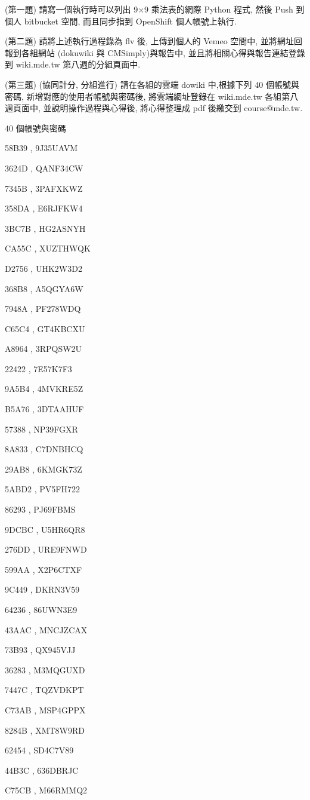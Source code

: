 \documentclass[]{article}
\begin{document}
(第一題) 請寫一個執行時可以列出 9×9 乘法表的網際 Python 程式, 然後 Push
到個人 bitbucket 空間, 而且同步指到 OpenShift 個人帳號上執行.

(第二題) 請將上述執行過程錄為 flv 後, 上傳到個人的 Vemeo 空間中,
並將網址回報到各組網站 (dokuwiki 與 CMSimply)與報告中,
並且將相關心得與報告連結登錄到 wiki.mde.tw 第八週的分組頁面中.

(第三題) (協同計分, 分組進行) 請在各組的雲端 dowiki 中,根據下列 40
個帳號與密碼, 新增對應的使用者帳號與密碼後, 將雲端網址登錄在 wiki.mde.tw
各組第八週頁面中, 並說明操作過程與心得後, 將心得整理成 pdf 後繳交到
course@mde.tw.

40 個帳號與密碼

58B39 , 9J35UAVM

3624D , QANF34CW

7345B , 3PAFXKWZ

358DA , E6RJFKW4

3BC7B , HG2ASNYH

CA55C , XUZTHWQK

D2756 , UHK2W3D2

368B8 , A5QGYA6W

7948A , PF278WDQ

C65C4 , GT4KBCXU

A8964 , 3RPQSW2U

22422 , 7E57K7F3

9A5B4 , 4MVKRE5Z

B5A76 , 3DTAAHUF

57388 , NP39FGXR

8A833 , C7DNBHCQ

29AB8 , 6KMGK73Z

5ABD2 , PV5FH722

86293 , PJ69FBMS

9DCBC , U5HR6QR8

276DD , URE9FNWD

599AA , X2P6CTXF

9C449 , DKRN3V59

64236 , 86UWN3E9

43AAC , MNCJZCAX

73B93 , QX945VJJ

36283 , M3MQGUXD

7447C , TQZVDKPT

C73AB , MSP4GPPX

8284B , XMT8W9RD

62454 , SD4C7V89

44B3C , 636DBRJC

C75CB , M66RMMQ2
\end{document}
